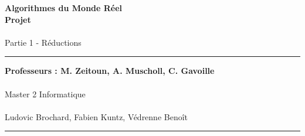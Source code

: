 \documentclass[a4paper]{article}
\newlength{\larg}
\begin{document}
\thispagestyle{empty}

\setlength{\unitlength}{1in}


\begin{flushright}
 \noindent {\rule{\larg}{0.5mm}}
\end{flushright}
\vspace{7mm}
\begin{flushright}
 \Huge{\bf Algorithmes du Monde Réel} \\
 \Huge{\bf Projet} \\
 ~\\
 \huge{Partie 1 - Réductions}\\
\end{flushright}
\vspace{7mm}
\begin{flushright}
 {\rule{\larg}{0.5mm}}
\end{flushright}
\vspace{2mm}
\begin{flushright}
 \large{\bf Professeurs : M. Zeitoun, A. Muscholl, C. Gavoille} \\
 ~\\
 \large{Master 2 Informatique}\\
 ~\\
 \vspace{10cm}
 \large{Ludovic Brochard, Fabien Kuntz, Védrenne Benoît}
{\rule{\larg}{0.5mm}}
\end{flushright}

\newpage

\addtolength{\oddsidemargin}{1cm}

\thispagestyle{empty}
\tableofcontents
\newpage

\setcounter{page}{1}










\end{document}
